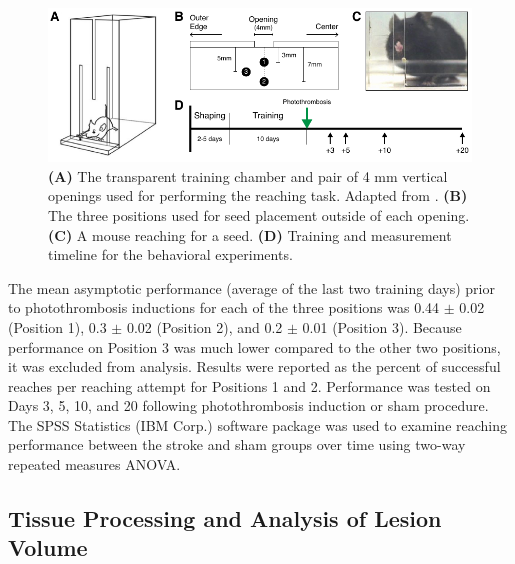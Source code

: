 \begin{figure}
    \includegraphics{figures/chapter_3/reachingtask.pdf}
    \caption[\textbf{(A)} The transparent training chamber and pair of 4 mm vertical openings used for performing the reaching task. \textbf{(B)} The three positions used for seed placement outside of each opening. \textbf{(C)} A mouse reaching for a seed. \textbf{(D)} Training and measurement timeline for the behavioral experiments.]{
        \label{fig:reachingtask}
        \textbf{(A)} The transparent training chamber and pair of 4 mm vertical openings used for performing the reaching task. Adapted from \cite{Chen:2014hy}. \textbf{(B)} The three positions used for seed placement outside of each opening. \textbf{(C)} A mouse reaching for a seed. \textbf{(D)} Training and measurement timeline for the behavioral experiments.
    }
\end{figure}

The mean asymptotic performance (average of the last two training days) prior to photothrombosis inductions for each of the three positions was 0.44 $\pm$ 0.02 (Position 1), 0.3 $\pm$ 0.02 (Position 2), and 0.2 $\pm$ 0.01 (Position 3). Because performance on Position 3 was much lower compared to the other two positions, it was excluded from analysis. Results were reported as the percent of successful reaches per reaching attempt for Positions 1 and 2. Performance was tested on Days 3, 5, 10, and 20 following photothrombosis induction or sham procedure. The SPSS Statistics (IBM Corp.) software package was used to examine reaching performance between the stroke and sham groups over time using two-way repeated measures ANOVA.

\subsection{Tissue Processing and Analysis of Lesion Volume}

